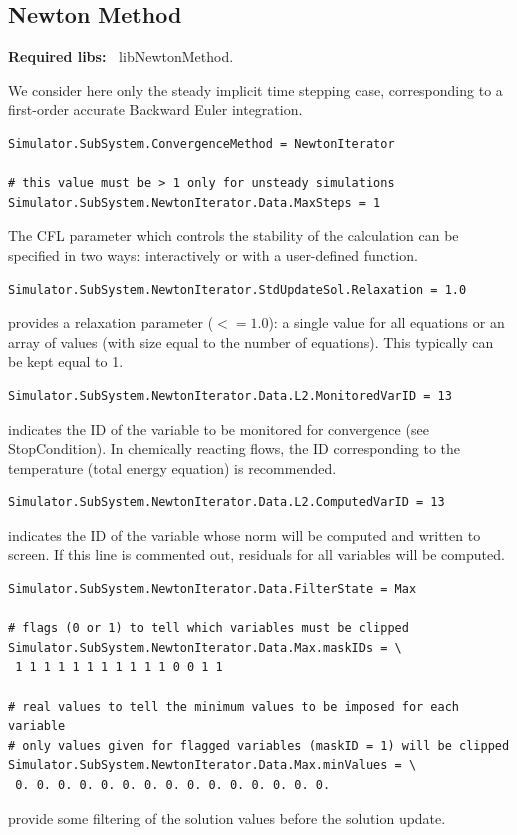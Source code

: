 \documentclass[11pt]{article}
\begin{document}
\subsection{Newton Method}

{\bf Required libs:~} libNewtonMethod.

We consider here only the steady implicit time stepping case, corresponding to a first-order accurate 
Backward Euler integration.

\begin{lstlisting}[breaklines]
Simulator.SubSystem.ConvergenceMethod = NewtonIterator

# this value must be > 1 only for unsteady simulations
Simulator.SubSystem.NewtonIterator.Data.MaxSteps = 1
\end{lstlisting}
The CFL parameter which controls the stability of the calculation can be specified in two ways: 
interactively or with a user-defined function.

\begin{lstlisting}[breaklines]
Simulator.SubSystem.NewtonIterator.StdUpdateSol.Relaxation = 1.0
\end{lstlisting}
provides a relaxation parameter ($<= 1.0$): a single value for all equations or an array of values (with size equal to the number of equations).
This typically can be kept equal to 1.

\begin{lstlisting}[breaklines]
Simulator.SubSystem.NewtonIterator.Data.L2.MonitoredVarID = 13
\end{lstlisting}
indicates the ID of the variable to be monitored for convergence (see StopCondition). In chemically reacting flows, 
the ID corresponding to the temperature (total energy equation) is recommended.
\begin{lstlisting}[breaklines]
Simulator.SubSystem.NewtonIterator.Data.L2.ComputedVarID = 13
\end{lstlisting}
indicates the ID of the variable whose norm will be computed and written to screen. If this line is commented out, residuals 
for all variables will be computed.

\begin{lstlisting}[breaklines]
Simulator.SubSystem.NewtonIterator.Data.FilterState = Max

# flags (0 or 1) to tell which variables must be clipped
Simulator.SubSystem.NewtonIterator.Data.Max.maskIDs = \
 1 1 1 1 1 1 1 1 1 1 1 0 0 1 1

# real values to tell the minimum values to be imposed for each variable 
# only values given for flagged variables (maskID = 1) will be clipped
Simulator.SubSystem.NewtonIterator.Data.Max.minValues = \
 0. 0. 0. 0. 0. 0. 0. 0. 0. 0. 0. 0. 0. 0. 0.
\end{lstlisting}
provide some filtering of the solution values before the solution update.  
\end{document}
